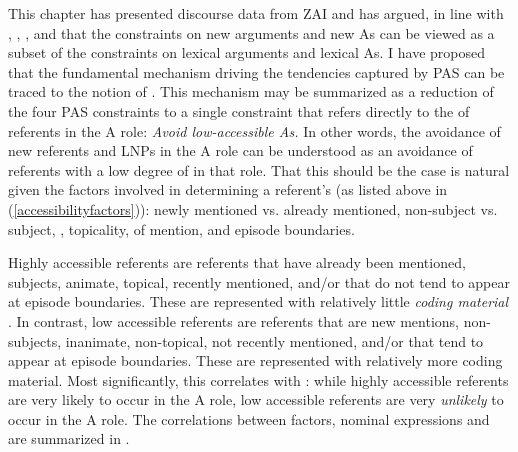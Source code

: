 This chapter has presented discourse data from ZAI and has argued, in line with \citet{haspelmath2006}, \citet{everett2009}, \citet{haig2016}, and \citet{schnell2017} that the constraints on new arguments and new As can be viewed as a subset of the constraints on lexical arguments and lexical As. I have proposed that the fundamental mechanism driving the tendencies captured by PAS can be traced to the notion of  \citep{ariel1990,ariel2001}. This mechanism may be summarized as a reduction of the four PAS constraints to a single constraint that refers directly to the  of referents in the A role: \textit{Avoid low-accessible As.} In other words, the avoidance of new referents and LNPs in the A role can be understood as an avoidance of referents with a low degree of  in that role. That this should be the case is natural given the factors involved in determining a referent's  (as listed above in (\ref{accessibilityfactors})): newly mentioned vs. already mentioned, non-subject vs. subject, , topicality,  of mention, and episode boundaries. 

Highly accessible referents are referents that have already been mentioned, subjects, animate, topical, recently mentioned, and/or that do not tend to appear at episode boundaries. These are represented with relatively little \textit{coding material} \citep{givon1983}. In contrast, low accessible referents are referents that are new mentions, non-subjects, inanimate, non-topical, not recently mentioned, and/or that tend to appear at episode boundaries. These are represented with relatively more coding material. Most significantly, this correlates with : while highly accessible referents are very likely to occur in the A role, low accessible referents are very \textit{unlikely} to occur in the A role. The correlations between  factors, nominal expressions and  are summarized in .


